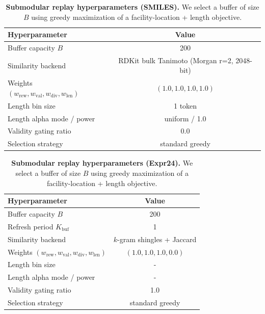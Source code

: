 \documentclass{article}
\theoremstyle{plain}
\theoremstyle{definition}
\theoremstyle{remark}
\begin{document}
\begin{table}[!htbp]
\centering
\small
\setlength{\tabcolsep}{5pt}
\renewcommand{\arraystretch}{1.10}
\caption{\textbf{Submodular replay hyperparameters (SMILES).}
We select a buffer of size $B$ using greedy maximization of a facility-location + length objective.
}
\label{tab:repro_subm_smiles}
\begin{tabular}{lc}
\toprule
Hyperparameter & Value \\
\midrule
Buffer capacity $B$ & 200 \\
Similarity backend & RDKit bulk Tanimoto (Morgan r=2, 2048-bit) \\
Weights $(w_{\mathrm{rew}}, w_{\mathrm{val}}, w_{\mathrm{div}}, w_{\mathrm{len}})$ & $(1.0, 1.0, 1.0, 1.0)$ \\
Length bin size &  1 token \\
Length alpha mode / power & uniform / 1.0 \\
Validity gating ratio & 0.0 \\
Selection strategy & standard greedy \\
\bottomrule
\end{tabular}
\end{table}

\begin{table}[!htbp]
\centering
\small
\setlength{\tabcolsep}{5pt}
\renewcommand{\arraystretch}{1.10}
\caption{\textbf{Submodular replay hyperparameters (Expr24).}
We select a buffer of size $B$ using greedy maximization of a facility-location + length objective.
}
\label{tab:repro_subm}
\begin{tabular}{lc}
\toprule
Hyperparameter & Value \\
\midrule
Buffer capacity $B$ & 200 \\
Refresh period $K_{\mathrm{buf}}$ & 1 \\
Similarity backend & $k$-gram shingles + Jaccard \\
Weights $(w_{\mathrm{rew}}, w_{\mathrm{val}}, w_{\mathrm{div}}, w_{\mathrm{len}})$ & $(1.0, 1.0, 1.0, 0.0)$ \\
Length bin size & - \\
Length alpha mode / power & - \\
Validity gating ratio & 1.0 \\
Selection strategy & standard greedy \\
\bottomrule
\end{tabular}
\end{table}
\end{document}
